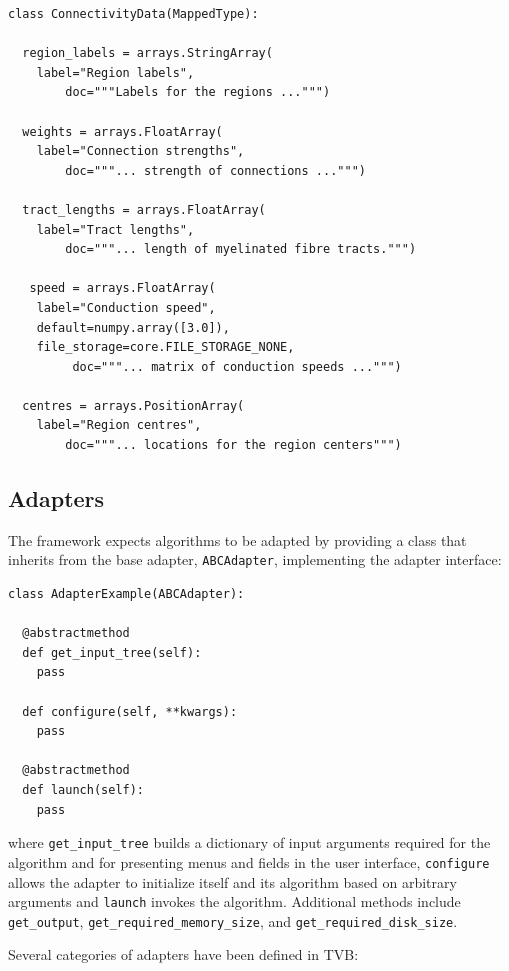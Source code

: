 \documentclass{bioinfo}
\begin{document}
\begin{lstlisting}[caption={The ConnectivityData listing},
                   label={lst:ConnectivityData}]
class ConnectivityData(MappedType):

  region_labels = arrays.StringArray( 
	label="Region labels", 
        doc="""Labels for the regions ...""")

  weights = arrays.FloatArray( 
	label="Connection strengths",
        doc="""... strength of connections ...""")

  tract_lengths = arrays.FloatArray( 
	label="Tract lengths",
        doc="""... length of myelinated fibre tracts.""")

   speed = arrays.FloatArray( 
	label="Conduction speed", 
	default=numpy.array([3.0]), 
	file_storage=core.FILE_STORAGE_NONE,
         doc="""... matrix of conduction speeds ...""")

  centres = arrays.PositionArray( 
	label="Region centres",
        doc="""... locations for the region centers""")
\end{lstlisting}
	

\subsection{Adapters}

The framework expects algorithms to be adapted by providing a class
that inherits from the base adapter, \texttt{ABCAdapter}, implementing 
the adapter interface:

\begin{lstlisting}[caption={Excerpt of the ABCAdapter},
                   label={lst:ABCAdapter}]
class AdapterExample(ABCAdapter):

  @abstractmethod
  def get_input_tree(self):
  	pass

  def configure(self, **kwargs):
  	pass

  @abstractmethod
  def launch(self):
  	pass
\end{lstlisting}

\noindent where \texttt{get\_input\_tree} builds a dictionary of input
arguments required for the algorithm and for
presenting menus and fields in the user interface, \texttt{configure} allows the 
adapter to initialize itself and its algorithm based on arbitrary arguments
and \texttt{launch} invokes the algorithm.
Additional methods include \texttt{get\_output}, \texttt{get\_required\_memory\_size},
and
\texttt{get\_required\_disk\_size}.

Several categories of adapters have been defined in TVB: 
\end{document}
